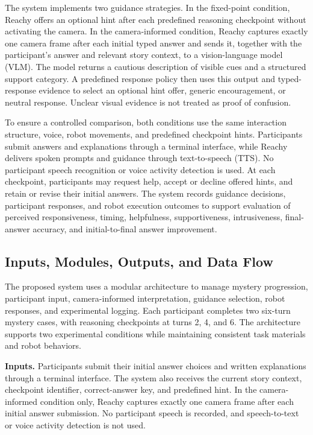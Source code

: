 \documentclass[conference]{IEEEtran}
\begin{document}
The system implements two guidance strategies. In the fixed-point condition, Reachy offers an optional hint after each predefined reasoning checkpoint without activating the camera. In the camera-informed condition, Reachy captures exactly one camera frame after each initial typed answer and sends it, together with the participant's answer and relevant story context, to a vision-language model (VLM). The model returns a cautious description of visible cues and a structured support category. A predefined response policy then uses this output and typed-response evidence to select an optional hint offer, generic encouragement, or neutral response. Unclear visual evidence is not treated as proof of confusion.

To ensure a controlled comparison, both conditions use the same interaction structure, voice, robot movements, and predefined checkpoint hints. Participants submit answers and explanations through a terminal interface, while Reachy delivers spoken prompts and guidance through text-to-speech (TTS). No participant speech recognition or voice activity detection is used. At each checkpoint, participants may request help, accept or decline offered hints, and retain or revise their initial answers. The system records guidance decisions, participant responses, and robot execution outcomes to support evaluation of perceived responsiveness, timing, helpfulness, supportiveness, intrusiveness, final-answer accuracy, and initial-to-final answer improvement.


\subsection{Inputs, Modules, Outputs, and Data Flow}

The proposed system uses a modular architecture to manage mystery progression, participant input, camera-informed interpretation, guidance selection, robot responses, and experimental logging. Each participant completes two six-turn mystery cases, with reasoning checkpoints at turns 2, 4, and 6. The architecture supports two experimental conditions while maintaining consistent task materials and robot behaviors.

\noindent\textbf{Inputs.}
Participants submit their initial answer choices and written explanations through a terminal interface. The system also receives the current story context, checkpoint identifier, correct-answer key, and predefined hint. In the camera-informed condition only, Reachy captures exactly one camera frame after each initial answer submission. No participant speech is recorded, and speech-to-text or voice activity detection is not used.
\end{document}
